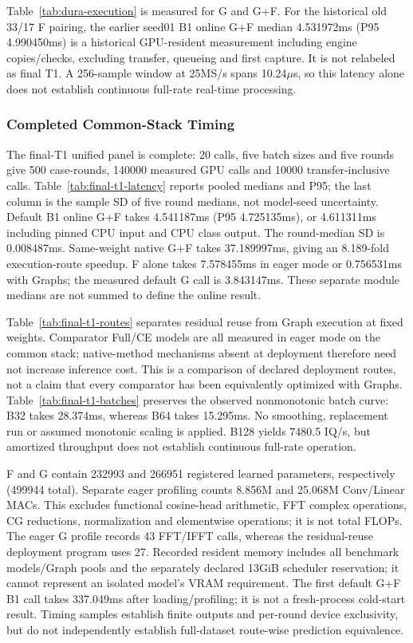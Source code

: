Table~\ref{tab:dura-execution} is measured for G and G+F. For the historical old 33/17 F pairing, the earlier seed01 B1 online G+F median 4.531972ms (P95 4.990450ms) is a historical GPU-resident measurement including engine copies/checks, excluding transfer, queueing and first capture. It is not relabeled as final T1. A 256-sample window at 25MS/s spans 10.24$\mu$s, so this latency alone does not establish continuous full-rate real-time processing.

\subsubsection{Completed Common-Stack Timing}
The final-T1 unified panel is complete: 20 calls, five batch sizes and five rounds give 500 case-rounds, 140000 measured GPU calls and 10000 transfer-inclusive calls. Table~\ref{tab:final-t1-latency} reports pooled medians and P95; the last column is the sample SD of five round medians, not model-seed uncertainty. Default B1 online G+F takes 4.541187ms (P95 4.725135ms), or 4.611311ms including pinned CPU input and CPU class output. The round-median SD is 0.008487ms. Same-weight native G+F takes 37.189997ms, giving an 8.189-fold execution-route speedup. F alone takes 7.578455ms in eager mode or 0.756531ms with Graphs; the measured default G call is 3.843147ms. These separate module medians are not summed to define the online result.



Table~\ref{tab:final-t1-routes} separates residual reuse from Graph execution at fixed weights. Comparator Full/CE models are all measured in eager mode on the common stack; native-method mechanisms absent at deployment therefore need not increase inference cost. This is a comparison of declared deployment routes, not a claim that every comparator has been equivalently optimized with Graphs. Table~\ref{tab:final-t1-batches} preserves the observed nonmonotonic batch curve: B32 takes 28.374ms, whereas B64 takes 15.295ms. No smoothing, replacement run or assumed monotonic scaling is applied. B128 yields 7480.5 IQ/s, but amortized throughput does not establish continuous full-rate operation.

F and G contain 232993 and 266951 registered learned parameters, respectively (499944 total). Separate eager profiling counts 8.856M and 25.068M Conv/Linear MACs. This excludes functional cosine-head arithmetic, FFT complex operations, CG reductions, normalization and elementwise operations; it is not total FLOPs. The eager G profile records 43 FFT/IFFT calls, whereas the residual-reuse deployment program uses 27. Recorded resident memory includes all benchmark models/Graph pools and the separately declared 13GiB scheduler reservation; it cannot represent an isolated model's VRAM requirement. The first default G+F B1 call takes 337.049ms after loading/profiling; it is not a fresh-process cold-start result. Timing samples establish finite outputs and per-round device exclusivity, but do not independently establish full-dataset route-wise prediction equivalence.

